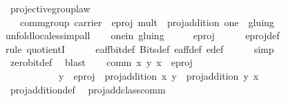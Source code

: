 \begin{isabellebody}
\isamarkupfalse%
\ projective{\isacharunderscore}group{\isacharunderscore}law{\isacharcolon}\isanewline
\ \ \ {\isachardoublequoteopen}comm{\isacharunderscore}group\ {\isasymlparr}carrier\ {\isacharequal}\ e{\isacharunderscore}proj{\isacharcomma}\ mult\ {\isacharequal}\ proj{\isacharunderscore}addition{\isacharcomma}\ one\ {\isacharequal}\ gluing\ {\isacharbackquote}{\isacharbackquote}\ {\isacharbraceleft}{\isacharparenleft}{\isacharparenleft}{}{\isacharcomma}{}{\isacharparenright}{\isacharcomma}{}{\isacharparenright}{\isacharbraceright}{\isasymrparr}{\isachardoublequoteclose}\ \isanewline
%
\isadelimproof
%
\endisadelimproof
%
\isatagproof
{}\isamarkupfalse%
{\isacharparenleft}unfold{\isacharunderscore}locales{\isacharcomma}simp{\isacharunderscore}all{\isacharparenright}\isanewline
\ \ \isamarkupfalse%
\ one{\isacharunderscore}in{\isacharcolon}\ {\isachardoublequoteopen}gluing\ {\isacharbackquote}{\isacharbackquote}\ {\isacharbraceleft}{\isacharparenleft}{\isacharparenleft}{}{\isacharcomma}\ {}{\isacharparenright}{\isacharcomma}\ {}{\isacharparenright}{\isacharbraceright}\ {\isasymin}\ e{\isacharunderscore}proj{\isachardoublequoteclose}\isanewline
\ \ \ \ \isamarkupfalse%
\ e{\isacharunderscore}proj{\isacharunderscore}def\ \isanewline
\ \ \ \ \isamarkupfalse%
{\isacharparenleft}rule\ quotientI{\isacharparenright}\isanewline
\ \ \ \ \isamarkupfalse%
\ e{\isacharunderscore}aff{\isacharunderscore}bit{\isacharunderscore}def\ Bits{\isacharunderscore}def\ e{\isacharunderscore}aff{\isacharunderscore}def\ e{\isacharprime}{\isacharunderscore}def\ \isanewline
\ \ \ \ \isamarkupfalse%
{\isacharparenleft}simp{\isacharparenright}\ \isanewline
\ \ \ \ \isamarkupfalse%
\ zero{\isacharunderscore}bit{\isacharunderscore}def\ \isamarkupfalse%
\ blast\isanewline
\isanewline
\ \ \isamarkupfalse%
\ comm{\isacharcolon}\ {\isachardoublequoteopen}{\isasymAnd}x\ y{\isachardot}\ x\ {\isasymin}\ e{\isacharunderscore}proj\ {\isasymLongrightarrow}\isanewline
\ \ \ \ \ \ \ \ \ \ \ y\ {\isasymin}\ e{\isacharunderscore}proj\ {\isasymLongrightarrow}\ proj{\isacharunderscore}addition\ x\ y\ {\isacharequal}\ proj{\isacharunderscore}addition\ y\ x{\isachardoublequoteclose}\isanewline
\ \ \ \ \isamarkupfalse%
\ proj{\isacharunderscore}addition{\isacharunderscore}def\ \isamarkupfalse%
\ proj{\isacharunderscore}add{\isacharunderscore}class{\isacharunderscore}comm\ \isamarkupfalse%

\end{isabellebody}
